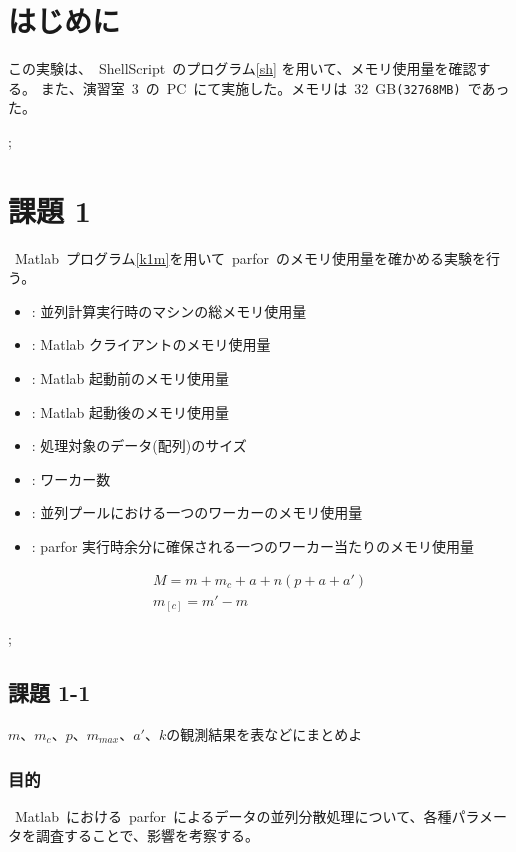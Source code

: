 \documentclass[10pt]{jarticle}
\title{\framebox{\hspace{4zw}データ科学 レポート2%
                 \hspace{4zw}}}
\author{神野 友哉 \\
        2022311042  \\
        愛知県立大学 情報科学部 情報科学科 \\}
\date{2023年12月11日}
\begin{document}
\maketitle
\section{はじめに}
%
この実験は、\ ShellScript\ のプログラム\ref{sh} を用いて、メモリ使用量を確認する。
また、演習室\ 3\ の\ PC\ にて実施した。メモリは\ 32\ GB\verb|(32768MB)|\ であった。

;

%

\section{課題 1}
%

\ Matlab\ プログラム\ref{k1m}を用いて\ parfor\ のメモリ使用量を確かめる実験を行う。
\begin{itemize}[left=30pt]
	\item[$M$]: 並列計算実行時のマシンの総メモリ使用量
	\item[$m_c$]: Matlab クライアントのメモリ使用量
	\item[$m$]: Matlab 起動前のメモリ使用量
	\item[$m'$]: Matlab 起動後のメモリ使用量
	\item[$a$]: 処理対象のデータ(配列)のサイズ
	\item[$n$]: ワーカー数
	\item[$p$]: 並列プールにおける一つのワーカーのメモリ使用量
	\item[$a'$]: parfor 実行時余分に確保される一つのワーカー当たりのメモリ使用量
\end{itemize}
\begin{gather}
	M = m + m_{c} + a + n (p + a + a') \label{ga:1}\\
	m_[c] = m' - m \label{ga:2}
\end{gather}

;
%

\subsection{課題 1-1}\label{kadai:1-1}
$m、 m_{c}、 p、 m_{max}、 a'、 k $の観測結果を表などにまとめよ
\subsubsection{目的}
%
\ Matlab\ における\ parfor\ によるデータの並列分散処理について、各種パラメータを調査することで、影響を考察する。
%
\end{document}
